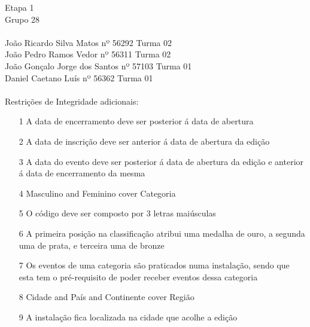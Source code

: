 \documentclass[12pt]{article}
\begin{document}
\noindent Etapa 1\\
Grupo 28\\
\\
João Ricardo Silva Matos nº 56292 Turma 02\\
João Pedro Ramos Vedor nº 56311 Turma 02\\
João Gonçalo Jorge dos Santos nº 57103 Turma 01\\
Daniel Caetano Luís nº 56362 Turma 01\\
\\
Restrições de Integridade adicionais:
\begin{itemize}
\item[1] A data de encerramento deve ser posterior á data de abertura
\item[2] A data de inscrição deve ser anterior á data de abertura da edição
\item[3] A data do evento deve ser posterior á data de abertura da edição e anterior á data de encerramento da mesma
\item[4] Masculino and Feminino cover Categoria
\item[5] O código deve ser composto por 3 letras maiúsculas
\item[6] A primeira posição na classificação atribui uma medalha de ouro, a segunda uma de prata, e  terceira uma de bronze
\item[7] Os eventos de uma categoria são praticados numa instalação, sendo que esta tem o pré-requisito de poder receber eventos dessa categoria
\item[8] Cidade and País and Continente cover Região
\item[9] A instalação fica localizada na cidade que acolhe a edição
\end{itemize}
\end{document}
